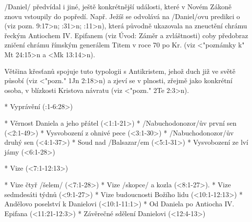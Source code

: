 \x/Daniel/ předvídal i jiné, ještě konkrétnější události, které v Novém Zákoně znovu vstoupily do popředí.
Např. Ježíš  se odvolává na \x/Daniel/ovu predikci o  (viz \<pozn. 9:17>n; :31>n; :11>n),
která původně ukazovala na zneuctění chrámu řeckým Antiochem IV. Epifanem (viz Úvod: Záměr a zvláštnosti) coby předobraz zničení chrámu  římským generálem Titem v roce 70 po Kr. (viz <"poznámky k" Mt 24:15>n a <Mk 13:14>n).

Většina křesťanů spojuje tuto typologii s Antikristem, jehož duch již ve světě působí (viz <"pozn." 1Jn 2:18>n) a zjeví se v plnosti, zřejmě jako konkrétní osoba, v blízkosti Kristova návratu (viz <"pozn." 2Te 2:3>n).



\Outline

\begitems
{}
* Vyprávění (:1-6:28>)

  \begitems
  * Věrnost Daniela a jeho přátel (<1:1-21>)
  * \x/Nabuchodonozor/ův první sen (<2:1-49>)
  * Vysvobození z ohnivé pece (<3:1-30>)
  * \x/Nabuchodonozor/ův druhý sen (<4:1-37>)
  * Soud nad \x/Balsazar/em (<5:1-31>)
  * Vysvobození ze lví jámy (<6:1-28>)
  \enditems

* Vize (<7:1-12:13>)

  \begitems
  * Vize  čtyř \x/šelem/ (<7:1-28>)
  * Vize \x/skopce/ a kozla (<8:1-27>).
  * Vize sedmdesáti týdnů (<9:1-27>)
  * Vize budoucnosti Božího lidu \nl (<10:1-12:13>)
    \begitems
    * Andělovo poselství k Danielovi \nl (<10:1-11:1>)
    * Od Daniela  po Antiocha IV. Epifana \nl (<11:21-12:3>)
    * Závěrečné sdělení Danielovi \nl (<12:4-13>)
    \enditems
  \enditems

\enditems
